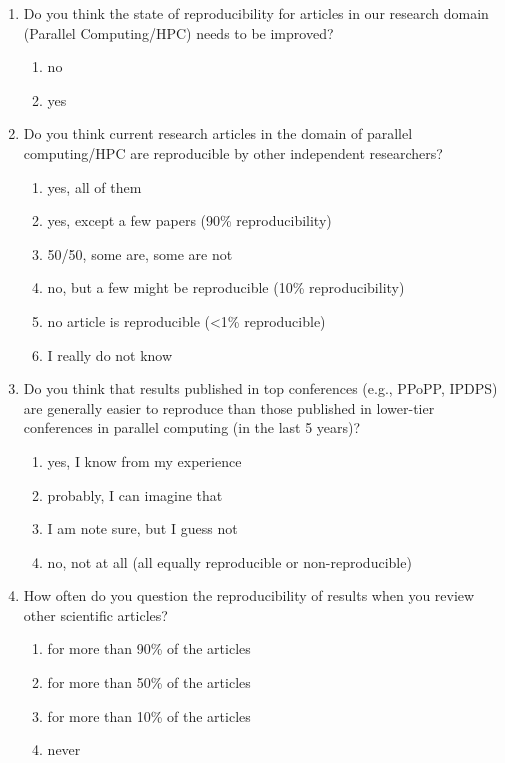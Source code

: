 \documentclass{article}\usepackage[]{graphicx}\usepackage[]{color}
\begin{document}
\begin{enumerate}
\item Do you think the state of reproducibility for articles in our
research domain (Parallel Computing/HPC) needs to be improved?
\begin{enumerate}
\item no
\item yes
\end{enumerate}

\item Do you think current research articles in the domain of parallel
computing/HPC are reproducible by other independent researchers?
\begin{enumerate}
\item yes, all of them
\item yes, except a few papers (90\% reproducibility)
\item 50/50, some are, some are not
\item no, but a few might be reproducible (10\% reproducibility)
\item no article is reproducible (<1\% reproducible)
\item I really do not know
\end{enumerate}

\item Do you think that results published in top conferences (e.g.,
PPoPP, IPDPS) are generally easier to reproduce than those
published in lower-tier conferences in parallel computing (in the
last 5 years)?
\begin{enumerate}
\item yes, I know from my experience
\item probably, I can imagine that
\item I am note sure, but I guess not
\item no, not at all (all equally reproducible or non-reproducible)
\end{enumerate}

\item How often do you question the reproducibility of results when you
review other scientific articles?
\begin{enumerate}
\item for more than 90\% of the articles
\item for more than 50\% of the articles
\item for more than 10\% of the articles
\item never
\end{enumerate}
\end{enumerate}
\end{document}
